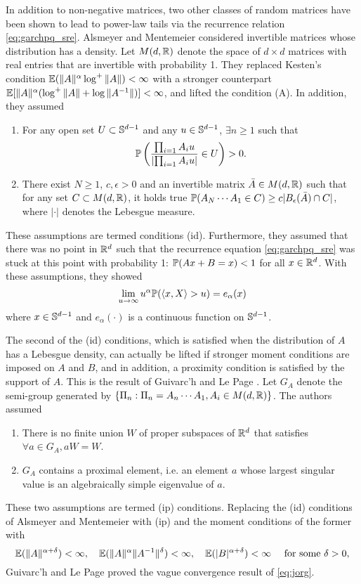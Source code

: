 In addition to non-negative matrices, two other classes of random
matrices have been shown to lead to power-law tails via the recurrence
relation \eqref{eq:garchpq_sre}. Alsmeyer and Mentemeier
\cite{alsmeyer:mentemeier:2012} considered invertible matrices whose
distribution has a density. Let $M(d, \reals)$ denote the space of
$d \times d$ matrices with real entries that are invertible with
probability 1. They replaced Kesten's condition
$\E (\|A\|^\alpha \log^+\|A\|) < \infty$ with a stronger
counterpart
$\E [\|A\|^\alpha (\log^+\|A\| + \log \|A^{-1} \|)] < \infty$,
and lifted the condition (A). In addition, they assumed
\begin{enumerate}
  \item For any open set $U \subset \sphere^{d-1}$ and any
    $u \in \sphere^{d-1}$,  $\exists n \geq 1$ such that
    \[
    \P\left({\prod_{i=1} A_i u
        \over
        \left|\prod_{i=1} A_i u\right|}\in U
    \right) > 0.
    \]
  \item There exist $N \geq 1$, $c, \epsilon > 0$ and an invertible
    matrix $\bar A \in M(d, \reals)$ such that for any set
    $C \subset M(d, \reals)$, it holds true
    $\P(A_N \cdots A_1 \in C) \geq c |B_\epsilon(\bar A) \cap C|$,
    where $|\cdot|$ denotes the Lebesgue measure.
\end{enumerate}
These assumptions are termed conditions (id). Furthermore, they assumed
that there was no point in $\reals^d$ such that the recurrence
equation \eqref{eq:garchpq_sre} was stuck at this point with probability 1: 
$\P(A x + B = x) < 1$ for all $x \in \reals^d$. With these
assumptions, they showed
\[
\lim_{u \to \infty} u^\alpha \P(\inn{x, X} > u) = e_\alpha(x)
\]
where $x \in \sphere^{d - 1}$ and $e_\alpha(\cdot)$ is a continuous
function on $\sphere^{d-1}$.

The second of the (id) conditions, which is satisfied when the
distribution of $A$ has a Lebesgue density, can actually be lifted if
stronger moment conditions are imposed on $A$ and $B$, and in
addition, a proximity condition is satisfied by the support of
$A$. This is the result of Guivarc'h and Le Page
\cite{guivarc:page:2016}. Let $G_A$ denote the semi-group generated
by $\{\Pi_n: \Pi_n = A_n \cdots A_1, A_i \in M(d, \reals)\}$. The
authors assumed
\begin{enumerate}
  \item There is no finite union $W$ of proper subspaces of $\reals^d$
    that satisfies $\forall a \in G_A, a W = W$.
  \item $G_A$ contains a proximal element, i.e. an element $a$ whose
    largest singular value is an algebraically simple eigenvalue of $a$.
\end{enumerate}
These two assumptions are termed (ip) conditions. Replacing the (id)
conditions of Alsmeyer and Mentemeier with (ip) and the moment
conditions of the former with
\[
\E (\|A\|^{\alpha + \delta}) < \infty, \quad
\E (\|A\|^{\alpha} \|A^{-1}\|^{\delta}) < \infty, \quad
\E (|B|^{\alpha + \delta}) < \infty \quad
\text{ for some }\delta > 0,
\]
Guivarc'h and Le Page proved the vague convergence result of
\eqref{eq:jorg}.


